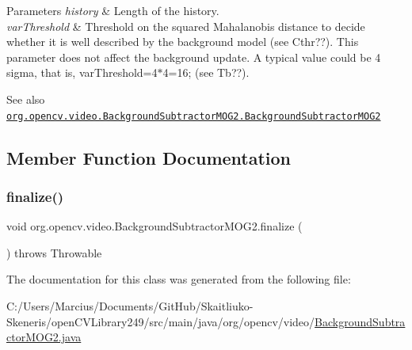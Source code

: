 \begin{DoxyParams}{Parameters}
{\em history} & Length of the history. \\
\hline
{\em var\+Threshold} & Threshold on the squared Mahalanobis distance to decide whether it is well described by the background model (see Cthr??). This parameter does not affect the background update. A typical value could be 4 sigma, that is, {\ttfamily var\+Threshold=4$\ast$4=16;} (see Tb??).\\
\hline
\end{DoxyParams}
\begin{DoxySeeAlso}{See also}
\href{http://docs.opencv.org/modules/video/doc/motion_analysis_and_object_tracking.html#backgroundsubtractormog2-backgroundsubtractormog2}{\tt org.\+opencv.\+video.\+Background\+Subtractor\+M\+O\+G2.\+Background\+Subtractor\+M\+O\+G2} 
\end{DoxySeeAlso}


\subsection{Member Function Documentation}
\mbox{\label{classorg_1_1opencv_1_1video_1_1_background_subtractor_m_o_g2_a1892c1c11287e7c0e305271f0472027c}} 
\subsubsection{\texorpdfstring{finalize()}{finalize()}}
{\footnotesize\ttfamily void org.\+opencv.\+video.\+Background\+Subtractor\+M\+O\+G2.\+finalize (\begin{DoxyParamCaption}{ }\end{DoxyParamCaption}) throws Throwable\hspace{0.3cm}{\ttfamily [protected]}}



The documentation for this class was generated from the following file\+:\begin{DoxyCompactItemize}
\item 
C\+:/\+Users/\+Marcius/\+Documents/\+Git\+Hub/\+Skaitliuko-\/\+Skeneris/open\+C\+V\+Library249/src/main/java/org/opencv/video/\mbox{\hyperlink{_background_subtractor_m_o_g2_8java}{Background\+Subtractor\+M\+O\+G2.\+java}}\end{DoxyCompactItemize}

